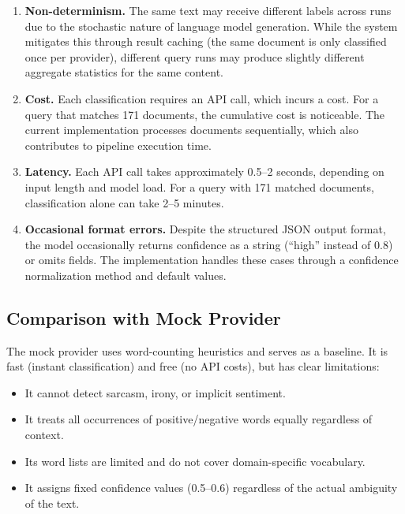 \begin{enumerate}
    \item \textbf{Non-determinism.} The same text may receive different labels across runs due to the stochastic nature of language model generation. While the system mitigates this through result caching (the same document is only classified once per provider), different query runs may produce slightly different aggregate statistics for the same content.

    \item \textbf{Cost.} Each classification requires an API call, which incurs a cost. For a query that matches 171 documents, the cumulative cost is noticeable. The current implementation processes documents sequentially, which also contributes to pipeline execution time.

    \item \textbf{Latency.} Each API call takes approximately 0.5--2 seconds, depending on input length and model load. For a query with 171 matched documents, classification alone can take 2--5 minutes.

    \item \textbf{Occasional format errors.} Despite the structured JSON output format, the model occasionally returns confidence as a string (``high'' instead of 0.8) or omits fields. The implementation handles these cases through a confidence normalization method and default values.
\end{enumerate}

\subsection{Comparison with Mock Provider}

The mock provider uses word-counting heuristics and serves as a baseline. It is fast (instant classification) and free (no API costs), but has clear limitations:

\begin{itemize}
    \item It cannot detect sarcasm, irony, or implicit sentiment.
    \item It treats all occurrences of positive/negative words equally regardless of context.
    \item Its word lists are limited and do not cover domain-specific vocabulary.
    \item It assigns fixed confidence values (0.5--0.6) regardless of the actual ambiguity of the text.
\end{itemize}

